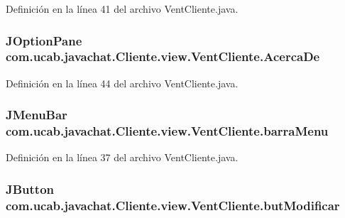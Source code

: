 Definición en la línea 41 del archivo Vent\-Cliente.\-java.

\hypertarget{classcom_1_1ucab_1_1javachat_1_1_cliente_1_1view_1_1_vent_cliente_aa5b1c55637429e4f697d736b09785113}{
\subsubsection[{Acerca\-De}]{\setlength{\rightskip}{0pt plus 5cm}J\-Option\-Pane com.\-ucab.\-javachat.\-Cliente.\-view.\-Vent\-Cliente.\-Acerca\-De}}\label{classcom_1_1ucab_1_1javachat_1_1_cliente_1_1view_1_1_vent_cliente_aa5b1c55637429e4f697d736b09785113}


Definición en la línea 44 del archivo Vent\-Cliente.\-java.

\hypertarget{classcom_1_1ucab_1_1javachat_1_1_cliente_1_1view_1_1_vent_cliente_aa8b0cdf243fc9aa223a7f6c8f81ef86c}{
\subsubsection[{barra\-Menu}]{\setlength{\rightskip}{0pt plus 5cm}J\-Menu\-Bar com.\-ucab.\-javachat.\-Cliente.\-view.\-Vent\-Cliente.\-barra\-Menu}}\label{classcom_1_1ucab_1_1javachat_1_1_cliente_1_1view_1_1_vent_cliente_aa8b0cdf243fc9aa223a7f6c8f81ef86c}


Definición en la línea 37 del archivo Vent\-Cliente.\-java.

\hypertarget{classcom_1_1ucab_1_1javachat_1_1_cliente_1_1view_1_1_vent_cliente_a3c70efb0ed43251cc5629e0b741e3831}{
\subsubsection[{but\-Modificar}]{\setlength{\rightskip}{0pt plus 5cm}J\-Button com.\-ucab.\-javachat.\-Cliente.\-view.\-Vent\-Cliente.\-but\-Modificar}}\label{classcom_1_1ucab_1_1javachat_1_1_cliente_1_1view_1_1_vent_cliente_a3c70efb0ed43251cc5629e0b741e3831}


